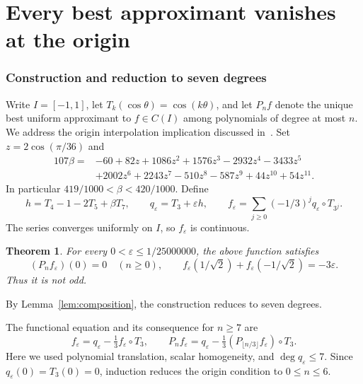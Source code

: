 \documentclass[11pt]{article}
\newtheorem{theorem}{Theorem}[section]
\theoremstyle{remark}\newtheorem{remark}[theorem]{Remark}
\begin{document}
\part{Every best approximant vanishes at the origin}
\section{Construction and reduction to seven degrees}
Write $I=[-1,1]$, let $T_k(\cos\theta)=\cos(k\theta)$, and let $P_n f$ denote
the unique best uniform approximant to $f\in C(I)$ among polynomials of degree
at most $n$. We address the origin interpolation implication discussed
in~\cite{SaffVarga}. Set $z=2\cos(\pi/36)$ and
\begin{align*}
107\beta={}&-60+82z+1086z^2+1576z^3-2932z^4-3433z^5\\
 &+2002z^6+2243z^7-510z^8-587z^9+44z^{10}+54z^{11}.
\end{align*}
In particular $419/1000<\beta<420/1000$. Define
\[
 h=T_4-1-2T_5+\beta T_7,\qquad q_\varepsilon=T_3+\varepsilon h,
 \qquad f_\varepsilon=\sum_{j\ge0}(-1/3)^j q_\varepsilon\circ T_{3^j}.
\]
The series converges uniformly on $I$, so $f_\varepsilon$ is continuous.

\begin{theorem}\label{origin:thm:main}
For every $0<\varepsilon\le 1/25000000$, the above function satisfies
\[
 (P_n f_\varepsilon)(0)=0\quad(n\ge0),\qquad
 f_\varepsilon(1/\sqrt2)+f_\varepsilon(-1/\sqrt2)=-3\varepsilon.
\]
Thus it is not odd.
\end{theorem}

By Lemma~\ref{lem:composition}, the construction reduces to seven degrees.

The functional equation and its consequence for $n\ge7$ are
\begin{equation}\label{origin:eq:induction}
 f_\varepsilon=q_\varepsilon-\tfrac13 f_\varepsilon\circ T_3,
 \qquad
 P_n f_\varepsilon=q_\varepsilon-\tfrac13
 (P_{\lfloor n/3\rfloor}f_\varepsilon)\circ T_3.
\end{equation}
Here we used polynomial translation, scalar homogeneity, and
$\deg q_\varepsilon\le7$. Since $q_\varepsilon(0)=T_3(0)=0$, induction reduces
the origin condition to $0\le n\le6$.
\end{document}
